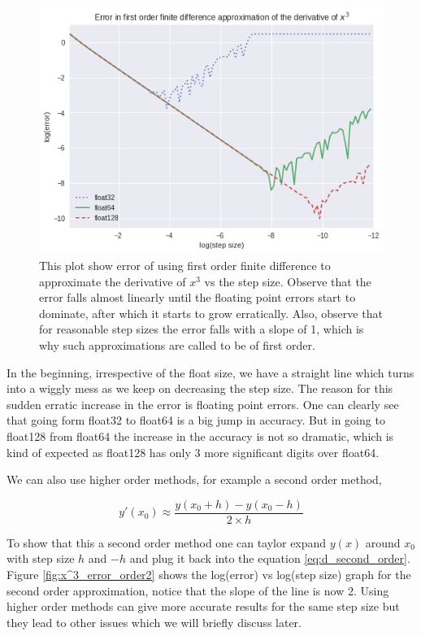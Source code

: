 \begin{figure}[hbt!]
    \centering
    \includegraphics[width=\textwidth]{images/x^3_error_order1.png}
    \caption[Error in the approximation of the first derivative of $x^3$ by first order finite difference methods.]{This plot show error of using first order finite difference to approximate the derivative of $x^3$ vs the step size. Observe that the error falls almost linearly until the floating point errors start to dominate, after which it starts to grow erratically. Also, observe that for reasonable step sizes the error falls with a slope of 1, which is why such approximations are called to be of first order. }\label{fig:x^3_error_order1}
\end{figure}

In the beginning, irrespective of the float size, we have a straight line which turns into a wiggly mess as we keep on decreasing the step size. The reason for this sudden erratic increase in the error is floating point errors. One can clearly see that going form float32 to float64 is a big jump in accuracy. But in going to float128 from float64 the increase in the accuracy is not so dramatic, which is kind of expected as float128 has only 3 more significant digits over float64.

We can also use higher order methods, for example a second order method,

\begin{equation}
    y'(x_0)  \approx \frac{y(x_0 + h) - y(x_0 - h)}{2 \times h}
    \label{eq:d_second_order}
\end{equation}

To show that this a second order method one can taylor expand $y(x)$ around $x_0$ with step size $h$ and $-h$ and plug it back into the equation \ref{eq:d_second_order}. Figure \ref{fig:x^3_error_order2} shows the log(error) vs log(step size) graph for the second order approximation, notice that the slope of the line is now 2. Using higher order methods can give more accurate results for the same step size but they lead to other issues which we will briefly discuss later.

